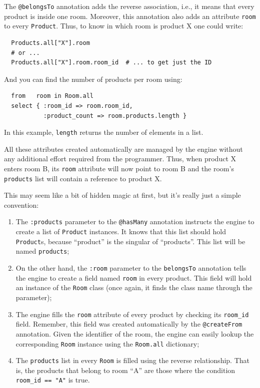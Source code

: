 \documentclass{report}
\begin{document}
The \verb=@belongsTo= annotation adds the reverse association, i.e.,
it means that every product is inside one room. Moreover, this
annotation also adds an attribute \verb=room= to every
\verb=Product=. Thus, to know in which room is product X one could
write:

\begin{lstlisting}
  Products.all["X"].room
  # or ...
  Products.all["X"].room.room_id  # ... to get just the ID
\end{lstlisting}

And you can find the number of products per room using:

\begin{lstlisting}
  from   room in Room.all
  select { :room_id => room.room_id,
           :product_count => room.products.length }
\end{lstlisting}

In this example, \verb=length= returns the number of elements in a
list.

All these attributes created automatically are managed by the engine
without any additional effort required from the programmer. Thus, when
product X enters room B, its \verb=room= attribute will now point to
room B and the room's \verb=products= list will contain a reference to
product X.

This may seem like a bit of hidden magic at first, but it's really
just a simple convention:

\begin{enumerate}
\item The \verb=:products= parameter to the \verb=@hasMany= annotation
  instructs the engine to create a list of \verb=Product=
  instances. It knows that this list should hold \verb=Product=s,
  because ``product'' is the singular of ``products''. This list will
  be named \verb=products=;
\item On the other hand, the \verb=:room= parameter to the
  \verb=belongsTo= annotation tells the engine to create a field named
  \verb=room= in every product. This field will hold an instance of the
  \verb=Room= class (once again, it finds the class name through the
  parameter);
\item The engine fills the \verb=room= attribute of every product by
  checking its \verb=room_id= field. Remember, this field was created
  automatically by the \verb=@createFrom= annotation. Given the
  identifier of the room, the engine can easily lookup the
  corresponding \verb=Room= instance using the \verb=Room.all=
  dictionary;
\item The \verb=products= list in every \verb=Room= is filled using
  the reverse relationship. That is, the products that belong to room
  ``A'' are those where the condition \verb!room_id == "A"! is true.
\end{enumerate}
\end{document}
